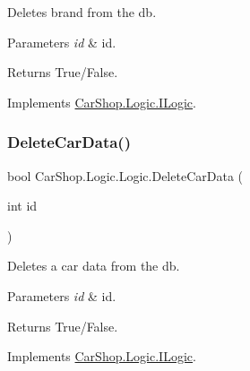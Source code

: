 Deletes brand from the db. 


\begin{DoxyParams}{Parameters}
{\em id} & id.\\
\hline
\end{DoxyParams}
\begin{DoxyReturn}{Returns}
True/\+False.
\end{DoxyReturn}


Implements \mbox{\hyperlink{interface_car_shop_1_1_logic_1_1_i_logic_aa8a7a73b34402f97bdf72e3162b95996}{Car\+Shop.\+Logic.\+I\+Logic}}.

\mbox{\label{class_car_shop_1_1_logic_1_1_logic_ad5164bc7532cb15395d83f6d22b9b816}} 
\subsubsection{\texorpdfstring{Delete\+Car\+Data()}{DeleteCarData()}}
{\footnotesize\ttfamily bool Car\+Shop.\+Logic.\+Logic.\+Delete\+Car\+Data (\begin{DoxyParamCaption}\item[{int}]{id }\end{DoxyParamCaption})}



Deletes a car data from the db. 


\begin{DoxyParams}{Parameters}
{\em id} & id.\\
\hline
\end{DoxyParams}
\begin{DoxyReturn}{Returns}
True/\+False.
\end{DoxyReturn}


Implements \mbox{\hyperlink{interface_car_shop_1_1_logic_1_1_i_logic_ad11a46d5ab973ec4f7c9a56a1fb98907}{Car\+Shop.\+Logic.\+I\+Logic}}.

\mbox{\label{class_car_shop_1_1_logic_1_1_logic_a282e36a6aacd601780f92f47888dcdde}} 
